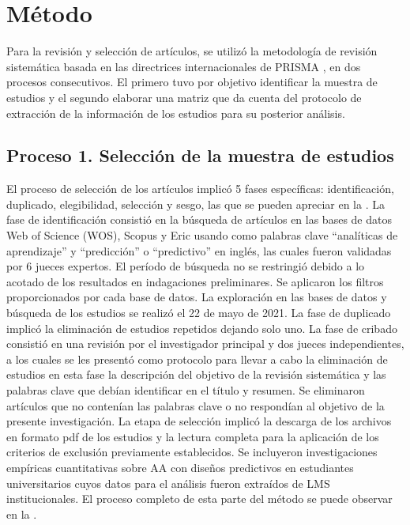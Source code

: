 \documentclass[spanish]{textolivre}
\begin{document}
\section{Método}
Para la revisión y selección de artículos, se utilizó la metodología de revisión sistemática basada en las directrices internacionales de PRISMA \cite{moher2015}, en dos procesos consecutivos. El primero tuvo por objetivo identificar la muestra de estudios y el segundo elaborar una matriz que da cuenta del protocolo de extracción de la información de los estudios para su posterior análisis.

\subsection{Proceso 1. Selección de la muestra de estudios}
El proceso de selección de los artículos implicó 5 fases específicas: identificación, duplicado, elegibilidad, selección y sesgo, las que se pueden apreciar en la . La fase de identificación consistió en la búsqueda de artículos en las bases de datos Web of Science (WOS), Scopus y Eric usando como palabras clave “analíticas de aprendizaje” y “predicción” o “predictivo” en inglés, las cuales fueron validadas por 6 jueces expertos. El período de búsqueda no se restringió debido a lo acotado de los resultados en indagaciones preliminares. Se aplicaron los filtros proporcionados por cada base de datos. La exploración en las bases de datos y búsqueda de los estudios se realizó el 22 de mayo de 2021. La fase de duplicado implicó la eliminación de estudios repetidos dejando solo uno. La fase de cribado consistió en una revisión por el investigador principal y dos jueces independientes, a los cuales se les presentó como protocolo para llevar a cabo la eliminación de estudios en esta fase la descripción del objetivo de la revisión sistemática y las palabras clave que debían identificar en el título y resumen. Se eliminaron artículos que no contenían las palabras clave o no respondían al objetivo de la presente investigación. La etapa de selección implicó la descarga de los archivos en formato pdf de los estudios y la lectura completa para la aplicación de los criterios de exclusión previamente establecidos. Se incluyeron investigaciones empíricas cuantitativas sobre AA con diseños predictivos en estudiantes universitarios cuyos datos para el análisis fueron extraídos de LMS institucionales. El proceso completo de esta parte del método se puede observar en la .
\end{document}

